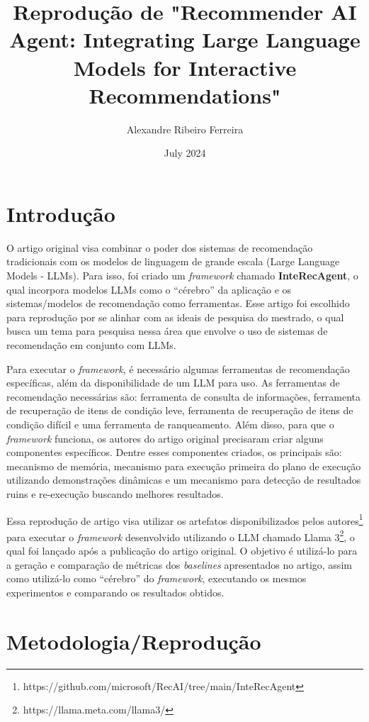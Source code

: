 \documentclass{article}
\title{Reprodução de "Recommender AI Agent: Integrating Large Language Models for Interactive Recommendations"}
\author{Alexandre Ribeiro Ferreira}
\date{July 2024}
\begin{document}
\maketitle

\section{Introdução}

O artigo original visa combinar o poder dos sistemas de recomendação tradicionais com os modelos de linguagem de grande escala (Large Language Models - LLMs). Para isso, foi criado um \textit{framework} chamado \textbf{InteRecAgent}, o qual incorpora modelos LLMs como o “cérebro” da aplicação e os sistemas/modelos de recomendação como ferramentas. Esse artigo foi escolhido para reprodução por se alinhar com as ideais de pesquisa do mestrado, o qual busca um tema para pesquisa nessa área que envolve o uso de sistemas de recomendação em conjunto com LLMs.

Para executar o \textit{framework}, é necessário algumas ferramentas de recomendação específicas, além da disponibilidade de um LLM para uso. As ferramentas de recomendação necessárias são: ferramenta de consulta de informações, ferramenta de recuperação de itens de condição leve, ferramenta de recuperação de itens de condição difícil e uma ferramenta de ranqueamento. Além disso, para que o \textit{framework} funciona, os autores do artigo original precisaram criar alguns componentes específicos. Dentre esses componentes criados, os principais são: mecanismo de memória, mecanismo para execução primeira do plano de execução utilizando demonstrações dinâmicas e um mecanismo para detecção de resultados ruins e re-execução buscando melhores resultados.

Essa reprodução de artigo visa utilizar os artefatos disponibilizados pelos autores\footnote{https://github.com/microsoft/RecAI/tree/main/InteRecAgent} para executar o \textit{framework} desenvolvido utilizando o LLM chamado Llama 3\footnote{https://llama.meta.com/llama3/}, o qual foi lançado após a publicação do artigo original. O objetivo é utilizá-lo para a geração e comparação de métricas dos \textit{baselines} apresentados no artigo, assim como utilizá-lo como “cérebro” do \textit{framework}, executando os mesmos experimentos e comparando os resultados obtidos.

\section{Metodologia/Reprodução}
\end{document}
